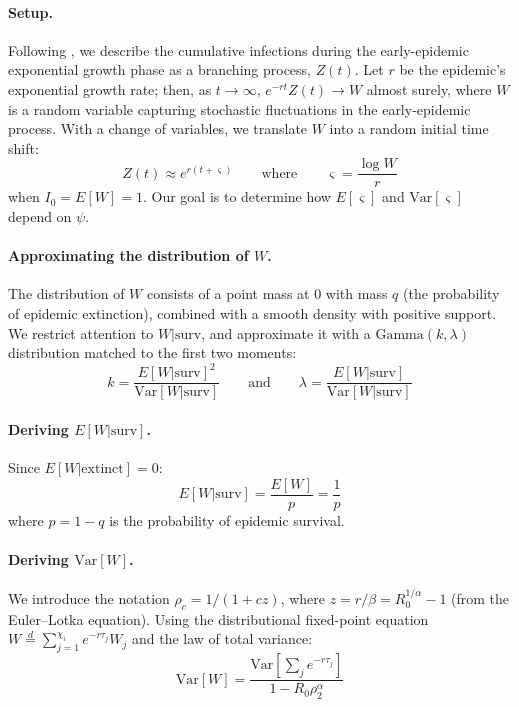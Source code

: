 \documentclass[10pt]{article}
\begin{document}
\paragraph{Setup.} Following \citet{morris_computation_2024}, we describe the cumulative infections during the early-epidemic exponential growth phase as a branching process, $Z(t)$. Let $r$ be the epidemic's exponential growth rate; then, as $t \rightarrow \infty$, $e^{-rt} Z(t) \rightarrow W$ almost surely, where $W$ is a random variable capturing stochastic fluctuations in the early-epidemic process. With a change of variables, we translate $W$ into a random initial time shift:
\begin{equation}
	Z(t) \approx e^{r (t + \varsigma)} \qquad \text{where} \qquad \varsigma = \frac{\log W}{r}
\end{equation}
when $I_0 = E[W] = 1$. Our goal is to determine how $E[\varsigma]$ and $\text{Var}[\varsigma]$ depend on $\psi$.

\paragraph{Approximating the distribution of $W$.} The distribution of $W$ consists of a point mass at 0 with mass $q$ (the probability of epidemic extinction), combined with a smooth density with positive support. We restrict attention to $W | \text{surv}$, and approximate it with a $\text{Gamma}(k, \lambda)$ distribution matched to the first two moments:
\begin{equation}
	k = \frac{E[W|\text{surv}]^2}{\text{Var}[W|\text{surv}]} \qquad \text{and} \qquad \lambda = \frac{E[W|\text{surv}]}{\text{Var}[W|\text{surv}]}
	\label{eq:k_and_lambda}
\end{equation}

\paragraph{Deriving $E[W|\text{surv}]$.} Since $E[W|\text{extinct}] = 0$:
\begin{equation}
	E[W|\text{surv}] = \frac{E[W]}{p} = \frac{1}{p}
\end{equation}
where $p = 1-q$ is the probability of epidemic survival.

\paragraph{Deriving $\text{Var}[W]$.} We introduce the notation $\rho_c = 1/(1+cz)$, where $z = r/\beta = R_0^{1/\alpha} - 1$ (from the Euler--Lotka equation). Using the distributional fixed-point equation $W \overset{d}{=} \sum_{j=1}^{\chi_i} e^{-r \tau_j} W_j$ and the law of total variance:
\begin{equation}
	\text{Var}[W] = \frac{\text{Var}[\sum_j e^{-r \tau_j}]}{1 - R_0 \rho_2^\alpha}
\end{equation}
\end{document}
